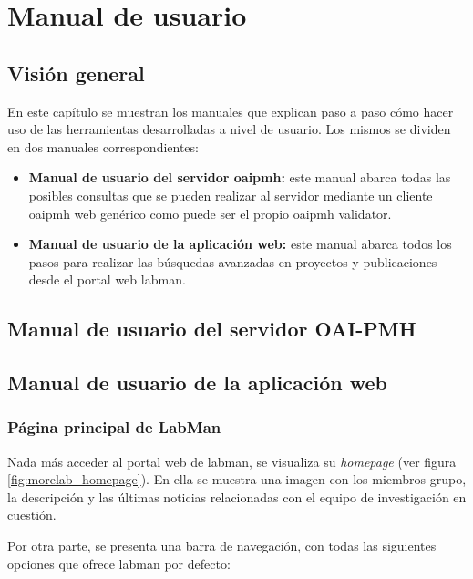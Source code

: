 \chapter{Manual de usuario}

\section{Visión general}

En este capítulo se muestran los manuales que explican paso a paso cómo hacer uso de las herramientas desarrolladas a nivel de usuario. Los mismos se dividen en dos manuales correspondientes:

\begin{itemize}
	\item \textbf{Manual de usuario del servidor \acrshort{oaipmh}:} este manual abarca todas las posibles consultas que se pueden realizar al servidor mediante un cliente \acrshort{oaipmh} web genérico como puede ser el propio \acrshort{oaipmh} validator.
	\item \textbf{Manual de usuario de la aplicación web:} este manual abarca todos los pasos para realizar las búsquedas avanzadas en proyectos y publicaciones desde el portal web \acrshort{labman}.
\end{itemize}

\section{Manual de usuario del servidor OAI-PMH}

\section{Manual de usuario de la aplicación web}

\subsection{Página principal de LabMan}

Nada más acceder al portal web de \acrshort{labman}, se visualiza su \textit{homepage} (ver figura \ref{fig:morelab_homepage}). En ella se muestra una imagen con los miembros grupo, la descripción y las últimas noticias relacionadas con el equipo de investigación en cuestión.

Por otra parte, se presenta una barra de navegación, con todas las siguientes opciones que ofrece \acrshort{labman} por defecto:


